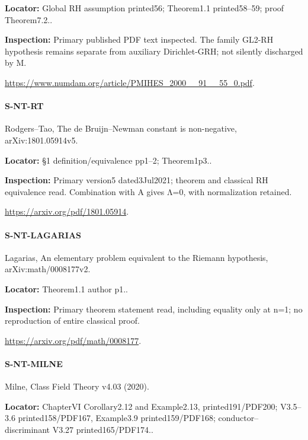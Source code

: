 \documentclass[11pt,a4paper]{article}
\begin{document}
\textbf{Locator:} Global RH assumption printed56; Theorem1.\allowbreak{}1 printed58–\allowbreak{}59; proof Theorem7.\allowbreak{}2.\allowbreak{}.

\textbf{Inspection:} Primary published PDF text inspected.\allowbreak{} The family GL2-RH hypothesis remains separate from auxiliary Dirichlet-GRH; not silently discharged by M.\allowbreak{}

\url{https://www.numdam.org/article/PMIHES_2000__91__55_0.pdf}.

\paragraph{S-NT-RT} Rodgers–\allowbreak{}Tao, The de Bruijn–\allowbreak{}Newman constant is non-negative, arXiv:\allowbreak{}1801.\allowbreak{}05914v5.

\textbf{Locator:} §1 definition/\allowbreak{}equivalence pp1–\allowbreak{}2; Theorem1p3.\allowbreak{}.

\textbf{Inspection:} Primary version5 dated3Jul2021; theorem and classical RH equivalence read.\allowbreak{} Combination with A gives Λ=0, with normalization retained.\allowbreak{}

\url{https://arxiv.org/pdf/1801.05914}.

\paragraph{S-NT-LAGARIAS} Lagarias, An elementary problem equivalent to the Riemann hypothesis, arXiv:\allowbreak{}math/\allowbreak{}0008177v2.

\textbf{Locator:} Theorem1.\allowbreak{}1 author p1.\allowbreak{}.

\textbf{Inspection:} Primary theorem statement read, including equality only at n=1; no reproduction of entire classical proof.\allowbreak{}

\url{https://arxiv.org/pdf/math/0008177}.

\paragraph{S-NT-MILNE} Milne, Class Field Theory v4.\allowbreak{}03 (2020).

\textbf{Locator:} ChapterVI Corollary2.\allowbreak{}12 and Example2.\allowbreak{}13, printed191/\allowbreak{}PDF200; V3.\allowbreak{}5–\allowbreak{}3.\allowbreak{}6 printed158/\allowbreak{}PDF167, Example3.\allowbreak{}9 printed159/\allowbreak{}PDF168; conductor–\allowbreak{}discriminant V3.\allowbreak{}27 printed165/\allowbreak{}PDF174.\allowbreak{}.
\end{document}
